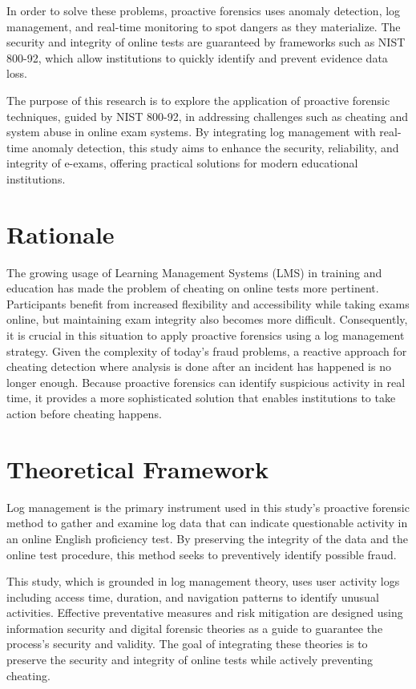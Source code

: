 In order to solve these problems, proactive forensics uses anomaly detection, log management, and real-time monitoring to spot dangers as they materialize. The security and integrity of online tests are guaranteed by frameworks such as NIST 800-92, which allow institutions to quickly identify and prevent evidence data loss.

The purpose of this research is to explore the application of proactive forensic techniques, guided by NIST 800-92, in addressing challenges such as cheating and system abuse in online exam systems. By integrating log management with real-time anomaly detection, this study aims to enhance the security, reliability, and integrity of e-exams, offering practical solutions for modern educational institutions.

\section{Rationale}

The growing usage of Learning Management Systems (LMS) in training and education has made the problem of cheating on online tests more pertinent. Participants benefit from increased flexibility and accessibility while taking exams online, but maintaining exam integrity also becomes more difficult. Consequently, it is crucial in this situation to apply proactive forensics using a log management strategy.
Given the complexity of today's fraud problems, a reactive approach for cheating detection where analysis is done after an incident has happened is no longer enough. Because proactive forensics can identify suspicious activity in real time, it provides a more sophisticated solution that enables institutions to take action before cheating happens.



\section{Theoretical Framework}

Log management is the primary instrument used in this study's proactive forensic method to gather and examine log data that can indicate questionable activity in an online English proficiency test. By preserving the integrity of the data and the online test procedure, this method seeks to preventively identify possible fraud.

This study, which is grounded in log management theory, uses user activity logs including access time, duration, and navigation patterns to identify unusual activities. Effective preventative measures and risk mitigation are designed using information security and digital forensic theories as a guide to guarantee the process's security and validity. The goal of integrating these theories is to preserve the security and integrity of online tests while actively preventing cheating.

